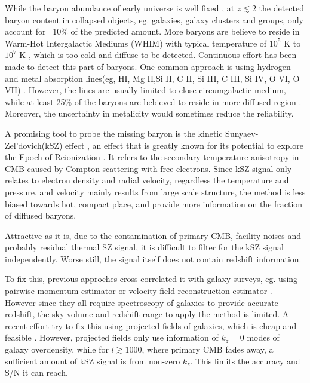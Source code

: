 While the baryon abundance of early universe is well fixed 
\cite{Cooke14}\cite{Fukugita98}\cite{Komatsu11}\cite{Hinshaw13}, 
at $z\lesssim 2$ the detected baryon content in collapsed
objects, eg. galaxies, galaxy clusters and groups, only account for ~10$\%$ of the predicted amount.
More baryons are believe to reside in Warm-Hot Intergalactic Mediums (WHIM) with typical temperature of $10^5$ K to $10^7$ K \cite{Pen1999}\cite{Soltan06}, which is too cold and diffuse to be detected.
Continuous effort has been made to detect this part of baryons. 
One common approach is using hydrogen and metal absorption lines(eg, HI, Mg II,Si II, C II, Si III, C III, Si IV, O VI, O VII) \cite{Fukugita04}\cite{Werk14}.
However, the lines are usually limited to close circumgalactic medium, while at least 25\% of the baryons are bebieved to reside in more diffused region \cite{Dave10}. Moreover, the uncertainty in metalicity would sometimes reduce the reliability.

A promising tool to probe the missing baryon is the kinetic Sunyaev-Zel'dovich(kSZ) effect \cite{Sunyaev72}\cite{Sunyaev80}, 
  an effect that is greatly known for its potential to explore the Epoch of Reionization \cite{Zhang04}\cite{McQuinn05}\cite{Zahn12}. 
It refers to the secondary temperature anisotropy in CMB caused by Compton-scattering with free electrons.  
Since kSZ signal only relates to electron density and radial velocity, 
regardless the temperature and pressure,  
and velocity mainly results from large scale structure, 
the method is less biased towards hot, compact place, 
and provide more information on the fraction of diffused baryons.

Attractive as it is, 
due to the contamination of primary CMB, facility noises and probably residual thermal SZ signal, 
it is difficult to filter for the kSZ signal independently. 
Worse still, the signal itself does not contain redshift information.

To fix this, previous approches cross correlated it with galaxy surveys, 
eg. using pairwise-momentum estimator \cite{Hand12} or velocity-field-reconstruction estimator \cite{Shao11}\cite{Li14}. 
However since they all require spectroscopy of galaxies to provide accurate redshift, the sky volume and redshift range to apply the method is limited. 
A recent effort try to fix this using projected fields of galaxies, which is cheap and feasible \cite{Hill16}. 
However, projected fields only use information of $k_z=0$ modes of galaxy overdensity, 
while for $l\gtrsim1000$, where primary CMB fades away, a sufficient amount of kSZ signal is from non-zero $k_z$. 
This limits the accuracy and S/N it can reach.

